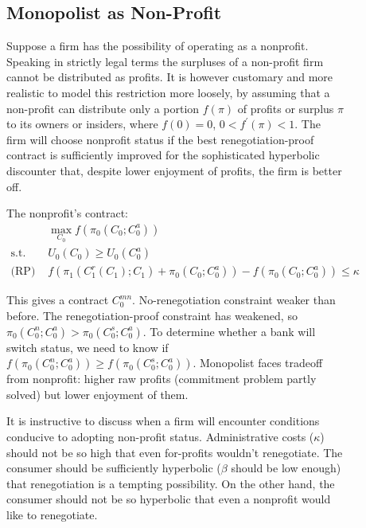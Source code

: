 \documentclass[11pt]{article}%
\begin{document}
\begin{figure}
{\subsection{Monopolist as Non-Profit}

Suppose a firm has the possibility of operating as a nonprofit. Speaking in
strictly legal terms the surpluses of a non-profit firm cannot be distributed
as profits. It is however customary and more realistic to model this
restriction more loosely, by assuming that a non-profit can distribute only a
portion $f\left(  \pi\right)  $ of profits or surplus $\pi$ to its owners or
insiders, where $f\left(  0\right)  =0$, $0<f^{\prime}\left(  \pi\right)  <1$.
The firm will choose nonprofit status if the best renegotiation-proof contract
is sufficiently improved for the sophisticated hyperbolic discounter that,
despite lower enjoyment of profits, the firm is better off.

The nonprofit's contract:%
\begin{align*}
&  \max_{C_{0}}f\left(  \pi_{0}\left(  C_{0};C_{0}^{a}\right)  \right) \\
\text{s.t. (PC) }  &  U_{0}\left(  C_{0}\right)  \geq U_{0}\left(  C_{0}%
^{a}\right) \\
\text{(RP) }  &  f\left(  \pi_{1}\left(  C_{1}^{r}\left(  C_{1}\right)
;C_{1}\right)  +\pi_{0}\left(  C_{0};C_{0}^{a}\right)  \right)  -f\left(
\pi_{0}\left(  C_{0};C_{0}^{a}\right)  \right)  \leq\kappa
\end{align*}


This gives a contract $C_{0}^{mn}$. No-renegotiation constraint weaker than
before. The renegotiation-proof constraint has weakened, so $\pi_{0}\left(
C_{0}^{n};C_{0}^{a}\right)  >\pi_{0}\left(  C_{0}^{s};C_{0}^{a}\right)  $. To
determine whether a bank will switch status, we need to know if $f\left(
\pi_{0}\left(  C_{0}^{n};C_{0}^{a}\right)  \right)  \geq f\left(  \pi
_{0}\left(  C_{0}^{s};C_{0}^{a}\right)  \right)  $. Monopolist faces tradeoff
from nonprofit: higher raw profits (commitment problem partly solved) but
lower enjoyment of them.

It is instructive to discuss when a firm will encounter conditions conducive
to adopting non-profit status. Administrative costs ($\kappa$) should not be
so high that even for-profits wouldn't renegotiate. The consumer should be
sufficiently hyperbolic ($\beta$ should be low enough) that renegotiation is a
tempting possibility. On the other hand, the consumer should not be so
hyperbolic that even a nonprofit would like to renegotiate.

}
\end{figure}
\end{document}
